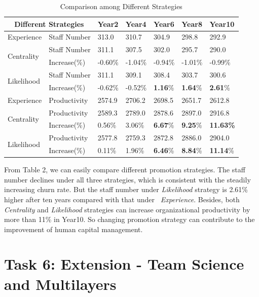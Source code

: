 \documentclass[tcn = 37075, sheet = false, abstract = false]{mcmthesis}
\begin{document}
	\begin{table}[htb!]
		\centering
		\begin{tabular}{lllllll}
			\hline
			\multicolumn{2}{c}{Different Strategies}     & Year2   & Year4   & Year6   & Year8   & Year10  \\ \hline
			Experience                  & Staff Number & 313.0   & 310.7   & 304.9   & 298.8   & 292.9   \\
			\multirow{2}{*}{Centrality} & Staff Number & 311.1   & 307.5   & 302.0   & 295.7   & 290.0   \\
			& Increase(\%) & -0.60\% & -1.04\% & -0.94\% & -1.01\% & -0.99\% \\
			\multirow{2}{*}{Likelihood} & Staff Number & 311.1   & 309.1   & 308.4   & 303.7   & 300.6   \\
			& Increase(\%) & -0.62\% & -0.52\% & \textbf{1.16}\%  &\textbf{1.64}\%  & \textbf{2.61}\%  \\ \hline
			Experience                  & Productivity & 2574.9  & 2706.2  & 2698.5  & 2651.7  & 2612.8  \\
			\multirow{2}{*}{Centrality} & Productivity & 2589.3  & 2789.0  & 2878.6  & 2897.0  & 2916.8  \\
			& Increase(\%) & 0.56\%  & 3.06\%  & \textbf{6.67}\%  & \textbf{9.25}\%  & \textbf{11.63\%} \\
			\multirow{2}{*}{Likelihood} & Productivity & 2577.8  & 2759.3  & 2872.8  & 2886.0  & 2904.0  \\
			& Increase(\%) & 0.11\%  & 1.96\%  & \textbf{6.46}\%  & \textbf{8.84}\%  & \textbf{11.14}\% \\ \hline
		\end{tabular}
		\label{tab:stra}
		\caption{Comparison among Different Strategies}
	\end{table}
	
	From Table 2, we can easily compare different promotion strategies. The staff number declines under all three strategies, which is consistent with the steadily increasing churn rate. But the staff number under \textit{Likelihood} strategy is 2.61\% higher after ten years compared with that under \ 
	\textit{Experience}. Besides, both \textit{Centrality} and \textit{Likelihood} strategies can increase organizational productivity by more than 11\% in Year10. So changing promotion strategy can contribute to the improvement of human capital management.
	
	\section{Task 6: Extension - Team Science and Multilayers}
	
\end{document}
